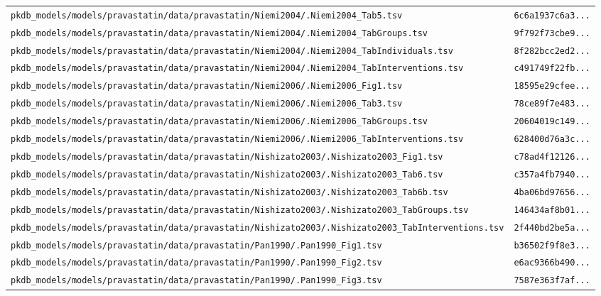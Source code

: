 \documentclass{article}
\begin{document}
\begin{longtable}{ll}
\texttt{pkdb\_models/models/pravastatin/data/pravastatin/Niemi2004/.Niemi2004\_Tab5.tsv} & \texttt{6c6a1937c6a3...} \\
\texttt{pkdb\_models/models/pravastatin/data/pravastatin/Niemi2004/.Niemi2004\_TabGroups.tsv} & \texttt{9f792f73cbe9...} \\
\texttt{pkdb\_models/models/pravastatin/data/pravastatin/Niemi2004/.Niemi2004\_TabIndividuals.tsv} & \texttt{8f282bcc2ed2...} \\
\texttt{pkdb\_models/models/pravastatin/data/pravastatin/Niemi2004/.Niemi2004\_TabInterventions.tsv} & \texttt{c491749f22fb...} \\
\texttt{pkdb\_models/models/pravastatin/data/pravastatin/Niemi2006/.Niemi2006\_Fig1.tsv} & \texttt{18595e29cfee...} \\
\texttt{pkdb\_models/models/pravastatin/data/pravastatin/Niemi2006/.Niemi2006\_Tab3.tsv} & \texttt{78ce89f7e483...} \\
\texttt{pkdb\_models/models/pravastatin/data/pravastatin/Niemi2006/.Niemi2006\_TabGroups.tsv} & \texttt{20604019c149...} \\
\texttt{pkdb\_models/models/pravastatin/data/pravastatin/Niemi2006/.Niemi2006\_TabInterventions.tsv} & \texttt{628400d76a3c...} \\
\texttt{pkdb\_models/models/pravastatin/data/pravastatin/Nishizato2003/.Nishizato2003\_Fig1.tsv} & \texttt{c78ad4f12126...} \\
\texttt{pkdb\_models/models/pravastatin/data/pravastatin/Nishizato2003/.Nishizato2003\_Tab6.tsv} & \texttt{c357a4fb7940...} \\
\texttt{pkdb\_models/models/pravastatin/data/pravastatin/Nishizato2003/.Nishizato2003\_Tab6b.tsv} & \texttt{4ba06bd97656...} \\
\texttt{pkdb\_models/models/pravastatin/data/pravastatin/Nishizato2003/.Nishizato2003\_TabGroups.tsv} & \texttt{146434af8b01...} \\
\texttt{pkdb\_models/models/pravastatin/data/pravastatin/Nishizato2003/.Nishizato2003\_TabInterventions.tsv} & \texttt{2f440bd2be5a...} \\
\texttt{pkdb\_models/models/pravastatin/data/pravastatin/Pan1990/.Pan1990\_Fig1.tsv} & \texttt{b36502f9f8e3...} \\
\texttt{pkdb\_models/models/pravastatin/data/pravastatin/Pan1990/.Pan1990\_Fig2.tsv} & \texttt{e6ac9366b490...} \\
\texttt{pkdb\_models/models/pravastatin/data/pravastatin/Pan1990/.Pan1990\_Fig3.tsv} & \texttt{7587e363f7af...} \\

\end{longtable}
\end{document}
